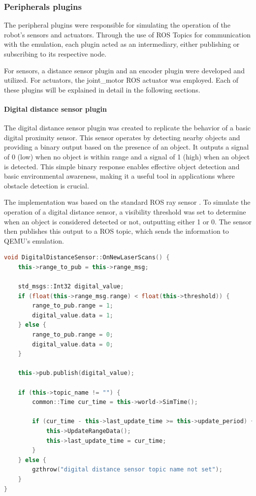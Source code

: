 \documentclass[../../monografia.tex]{subfiles}
\begin{document}
\subsubsection{Peripherals plugins}

The peripheral plugins were responsible for simulating the operation of the robot's sensors and actuators. Through the use of ROS Topics \cite{ROS_Topics_23} for communication with the emulation, each plugin acted as an intermediary, either publishing or subscribing to its respective node.

For sensors, a distance sensor plugin and an encoder plugin were developed and utilized. For actuators, the joint\_motor ROS actuator was employed. Each of these plugins will be explained in detail in the following sections.


\paragraph{Digital distance sensor plugin}
The digital distance sensor plugin was created to replicate the behavior of a basic digital proximity sensor. This sensor operates by detecting nearby objects and providing a binary output based on the presence of an object. It outputs a signal of 0 (low) when no object is within range and a signal of 1 (high) when an object is detected. This simple binary response enables effective object detection and basic environmental awareness, making it a useful tool in applications where obstacle detection is crucial.

The implementation was based on the standard ROS ray sensor \cite{ROS_Ray_Sensor_23}. To simulate the operation of a digital distance sensor, a visibility threshold was set to determine when an object is considered detected or not, outputting either 1 or 0. The sensor then publishes this output to a ROS topic, which sends the information to QEMU’s emulation.

\begin{lstlisting}[language=C++, caption={Digital distance sensor simulation with ray plugin}]
void DigitalDistanceSensor::OnNewLaserScans() {
    this->range_to_pub = this->range_msg;

    std_msgs::Int32 digital_value;
    if (float(this->range_msg.range) < float(this->threshold)) {
        range_to_pub.range = 1;
        digital_value.data = 1;
    } else {
        range_to_pub.range = 0;
        digital_value.data = 0;
    }

    this->pub.publish(digital_value);

    if (this->topic_name != "") {
        common::Time cur_time = this->world->SimTime();

        if (cur_time - this->last_update_time >= this->update_period) {
            this->UpdateRangeData();
            this->last_update_time = cur_time;
        }
    } else {
        gzthrow("digital distance sensor topic name not set");
    }
}
\end{lstlisting}
\end{document}
